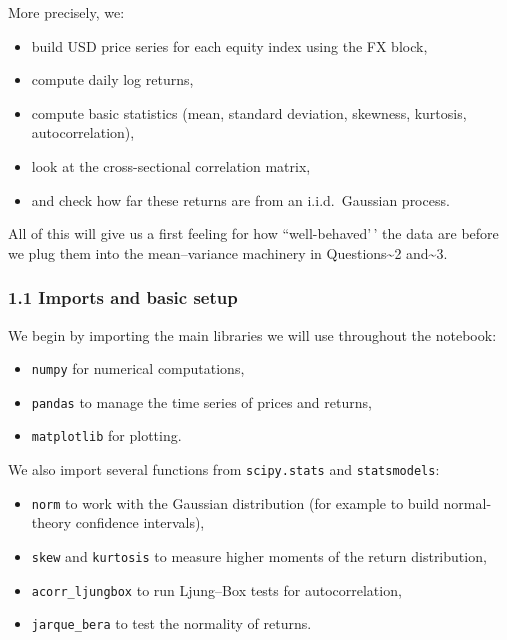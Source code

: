 \documentclass[11pt]{article}
\begin{document}
More precisely, we:

\begin{itemize}
  \item build USD price series for each equity index using the FX block,
  \item compute daily log returns,
  \item compute basic statistics (mean, standard deviation, skewness, kurtosis, autocorrelation),
  \item look at the cross-sectional correlation matrix,
  \item and check how far these returns are from an i.i.d.\ Gaussian process.
\end{itemize}

All of this will give us a first feeling for how ``well-behaved'\,' the
data are before we plug them into the mean--variance machinery in
Questions\textasciitilde2 and\textasciitilde3.

    \hypertarget{imports-and-basic-setup}{%
\subsubsection{1.1 Imports and basic
setup}\label{imports-and-basic-setup}}

We begin by importing the main libraries we will use throughout the
notebook:

\begin{itemize}
    \item \texttt{numpy} for numerical computations,
    \item \texttt{pandas} to manage the time series of prices and returns,
    \item \texttt{matplotlib} for plotting.
\end{itemize}

We also import several functions from \texttt{scipy.stats} and
\texttt{statsmodels}:

\begin{itemize}
    \item \texttt{norm} to work with the Gaussian distribution (for example to build normal-theory confidence intervals),
    \item \texttt{skew} and \texttt{kurtosis} to measure higher moments of the return distribution,
    \item \texttt{acorr\_ljungbox} to run Ljung--Box tests for autocorrelation,
    \item \texttt{jarque\_bera} to test the normality of returns.
\end{itemize}
\end{document}
